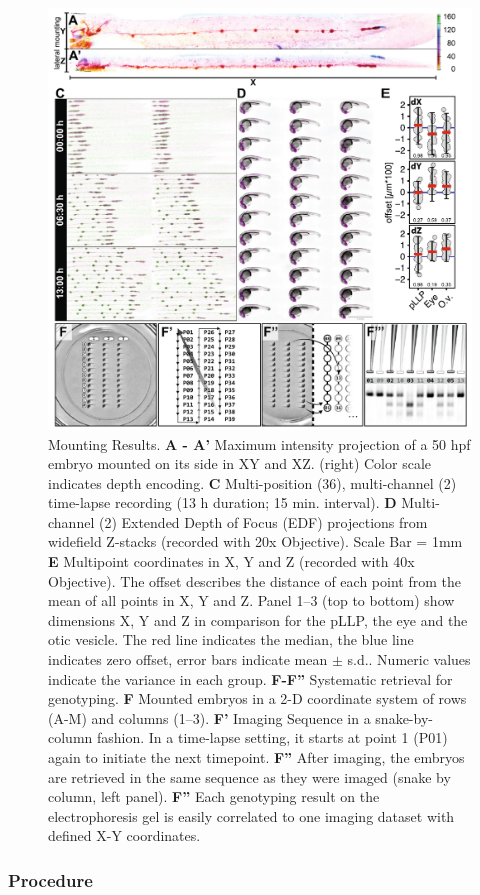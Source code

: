\documentclass[11pt,singlespacinge,twoside]{reedthesis} %
\theoremstyle{definition}
\theoremstyle{definition}
\theoremstyle{definition}
\theoremstyle{remark}
\begin{document}
\begin{figure}[H]

{\centering \includegraphics[width=0.95\linewidth,]{figures/results/00_methods/mounting/stamp_results} 

}

\caption[Mounting results]{Mounting Results. \textbf{A - A'} Maximum intensity projection of a 50 hpf embryo mounted on its side in XY and XZ. (right) Color scale indicates depth encoding. \textbf{C} Multi-position (36), multi-channel (2) time-lapse recording (13 h duration; 15 min. interval). \textbf{D} Multi-channel (2) Extended Depth of Focus (EDF) projections from widefield Z-stacks (recorded with 20x Objective). Scale Bar = 1mm \textbf{E} Multipoint coordinates in X, Y and Z (recorded with 40x Objective). The offset describes the distance of each point from the mean of all points in X, Y and Z. Panel 1--3 (top to bottom) show dimensions X, Y and Z in comparison for the pLLP, the eye and the otic vesicle. The red line indicates the median, the blue line indicates zero offset, error bars indicate mean \(\pm\) s.d.. Numeric values indicate the variance in each group. \textbf{F-F''} Systematic retrieval for genotyping. \textbf{F} Mounted embryos in a 2-D coordinate system of rows (A-M) and columns (1--3). \textbf{F'} Imaging Sequence in a snake-by-column fashion. In a time-lapse setting, it starts at point 1 (P01) again to initiate the next timepoint. \textbf{F''} After imaging, the embryos are retrieved in the same sequence as they were imaged (snake by column, left panel). \textbf{F''} Each genotyping result on the electrophoresis gel is easily correlated to one imaging dataset with defined X-Y coordinates.}\label{fig:stampresults}
\end{figure}
\hypertarget{procedure}{%
\subsubsection{Procedure}\label{procedure}}
\end{document}

